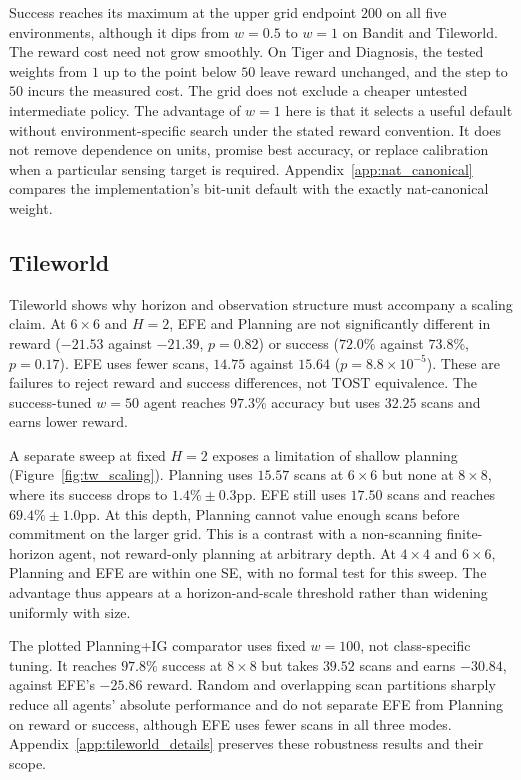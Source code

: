 \documentclass[runningheads]{llncs}
\begin{document}
Success reaches its maximum at the upper grid endpoint $200$ on all five environments, although it dips from $w{=}0.5$ to $w{=}1$ on Bandit and Tileworld. The reward cost need not grow smoothly. On Tiger and Diagnosis, the tested weights from $1$ up to the point below $50$ leave reward unchanged, and the step to $50$ incurs the measured cost. The grid does not exclude a cheaper untested intermediate policy. The advantage of $w{=}1$ here is that it selects a useful default without environment-specific search under the stated reward convention. It does not remove dependence on units, promise best accuracy, or replace calibration when a particular sensing target is required. Appendix~\ref{app:nat_canonical} compares the implementation's bit-unit default with the exactly nat-canonical weight.

\subsection{Tileworld}
\label{sec:tileworld}

Tileworld shows why horizon and observation structure must accompany a scaling claim. At $6{\times}6$ and $H{=}2$, EFE and Planning are not significantly different in reward ($-21.53$ against $-21.39$, $p=0.82$) or success ($72.0\%$ against $73.8\%$, $p=0.17$). EFE uses fewer scans, $14.75$ against $15.64$ ($p=8.8{\times}10^{-5}$). These are failures to reject reward and success differences, not TOST equivalence. The success-tuned $w{=}50$ agent reaches $97.3\%$ accuracy but uses $32.25$ scans and earns lower reward.

A separate sweep at fixed $H{=}2$ exposes a limitation of shallow planning (Figure~\ref{fig:tw_scaling}). Planning uses $15.57$ scans at $6{\times}6$ but none at $8{\times}8$, where its success drops to $1.4\%\pm0.3$pp. EFE still uses $17.50$ scans and reaches $69.4\%\pm1.0$pp. At this depth, Planning cannot value enough scans before commitment on the larger grid. This is a contrast with a non-scanning finite-horizon agent, not reward-only planning at arbitrary depth. At $4{\times}4$ and $6{\times}6$, Planning and EFE are within one SE, with no formal test for this sweep. The advantage thus appears at a horizon-and-scale threshold rather than widening uniformly with size.

The plotted Planning+IG comparator uses fixed $w{=}100$, not class-specific tuning. It reaches $97.8\%$ success at $8{\times}8$ but takes $39.52$ scans and earns $-30.84$, against EFE's $-25.86$ reward. Random and overlapping scan partitions sharply reduce all agents' absolute performance and do not separate EFE from Planning on reward or success, although EFE uses fewer scans in all three modes. Appendix~\ref{app:tileworld_details} preserves these robustness results and their scope.
\end{document}
